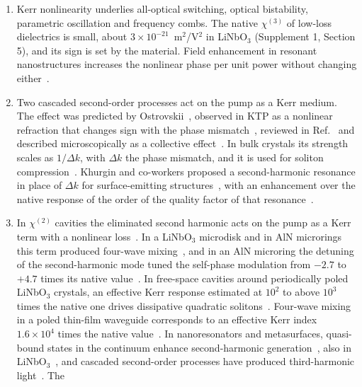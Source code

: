 \documentclass{optica-article}
\newcommand{\chitwo}{\chi^{(2)}}
\newcommand{\chithree}{\chi^{(3)}}
\begin{document}
\begin{enumerate}
\item Kerr nonlinearity underlies all-optical switching, optical
  bistability, parametric oscillation and frequency combs.  The native
  $\chithree$ of low-loss dielectrics is small, about
  $3\times10^{-21}$~m$^2$/V$^2$ in LiNbO$_3$ (Supplement 1, Section 5), and
  its sign is set by the material.  Field enhancement in resonant
  nanostructures increases the nonlinear phase per unit power without
  changing either~\cite{khurgin2013}.
\item Two cascaded second-order processes act on the pump as a Kerr
  medium.  The effect was predicted by Ostrovskii~\cite{ostrovskii1967},
  observed in KTP as a nonlinear refraction that changes sign with the
  phase mismatch~\cite{desalvo1992}, reviewed in Ref.~\cite{stegeman1996}
  and described microscopically as a collective effect~\cite{khurgin1997}.  In bulk crystals its
  strength scales as $1/\Delta k$, with $\Delta k$ the phase mismatch, and
  it is used for soliton compression~\cite{bache2007josab,bache2010,zhou2012}.
  Khurgin and co-workers proposed a second-harmonic resonance in place of
  $\Delta k$ for surface-emitting structures~\cite{khurgin1994,lee1995},
  with an enhancement over the native response of the order of the quality
  factor of that resonance~\cite{khurgin1997}.
\item In $\chitwo$ cavities the eliminated second harmonic acts on the pump
  as a Kerr term with a nonlinear
  loss~\cite{drummond1980,majumdar2013,fryett2015,gustin2025}.  In a
  LiNbO$_3$ microdisk and in AlN microrings this term produced four-wave
  mixing~\cite{liu2019ol,cui2022}, and in an AlN microring the
  detuning of the second-harmonic mode tuned the self-phase modulation from
  $-2.7$ to $+4.7$ times its native value~\cite{cui2025}.  In
  free-space cavities around periodically poled LiNbO$_3$ crystals, an
  effective Kerr response estimated at $10^2$ to above $10^3$ times the
  native one drives dissipative quadratic
  solitons~\cite{nie2026,musgrave2026,musgrave2026opo}.  Four-wave
  mixing in a poled thin-film waveguide corresponds to an effective Kerr
  index $1.6\times10^4$ times the native value~\cite{li2026}.  In nanoresonators
  and metasurfaces, quasi-bound states in the continuum enhance
  second-harmonic generation~\cite{carletti2018,koshelev2020,vabishchevich2018,liu2019,anthur2020},
  also in LiNbO$_3$~\cite{fedotova2020}, and cascaded second-order processes
  have produced third-harmonic light~\cite{celebrano2019,gennaro2022}.  The

\end{enumerate}
\end{document}
